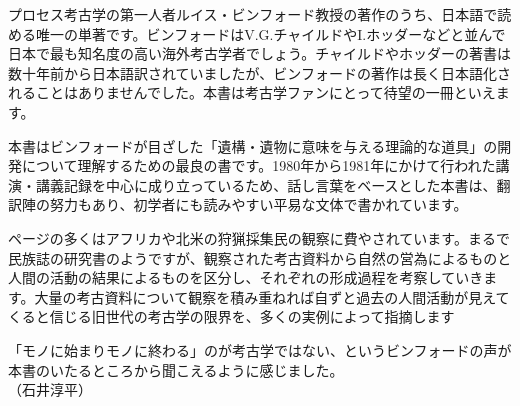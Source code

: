 \documentclass[a4j,11pt,twocolumn,openany]{jsbook}
\begin{document}
プロセス考古学の第一人者ルイス・ビンフォード教授の著作のうち、日本語で読める唯一の単著です。ビンフォードはV.G.チャイルドやI.ホッダーなどと並んで日本で最も知名度の高い海外考古学者でしょう。チャイルドやホッダーの著書は数十年前から日本語訳されていましたが、ビンフォードの著作は長く日本語化されることはありませんでした。本書は考古学ファンにとって待望の一冊といえます。

本書はビンフォードが目ざした「遺構・遺物に意味を与える理論的な道具」の開発について理解するための最良の書です。1980年から1981年にかけて行われた講演・講義記録を中心に成り立っているため、話し言葉をベースとした本書は、翻訳陣の努力もあり、初学者にも読みやすい平易な文体で書かれています。

ページの多くはアフリカや北米の狩猟採集民の観察に費やされています。まるで民族誌の研究書のようですが、観察された考古資料から自然の営為によるものと人間の活動の結果によるものを区分し、それぞれの形成過程を考察していきます。大量の考古資料について観察を積み重ねれば自ずと過去の人間活動が見えてくると信じる旧世代の考古学の限界を、多くの実例によって指摘します

「モノに始まりモノに終わる」のが考古学ではない、というビンフォードの声が本書のいたるところから聞こえるように感じました。\\
\hspace{15zw}（石井淳平）
\end{document}
